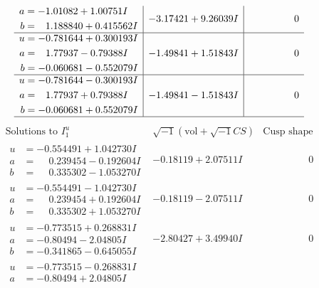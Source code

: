 \documentclass[1p]{elsarticle_modified}
\theoremstyle{definition}
\newcommand{\I}{\sqrt{-1}}
\begin{document}
$$\begin{array}{c|c|c}
\begin{aligned}
a &= -1.01082 + 1.00751 I \\
b &= \phantom{-}1.188840 + 0.415562 I\end{aligned}
 & -3.17421 + 9.26039 I & \phantom{-0.000000 } 0 \\ \hline\begin{aligned}
u &= -0.781644 + 0.300193 I \\
a &= \phantom{-}1.77937 - 0.79388 I \\
b &= -0.060681 - 0.552079 I\end{aligned}
 & -1.49841 + 1.51843 I & \phantom{-0.000000 } 0 \\ \hline\begin{aligned}
u &= -0.781644 - 0.300193 I \\
a &= \phantom{-}1.77937 + 0.79388 I \\
b &= -0.060681 + 0.552079 I\end{aligned}
 & -1.49841 - 1.51843 I & \phantom{-0.000000 } 0\\
 \hline 
 \end{array}$$\newpage$$\begin{array}{c|c|c}  
\text{Solutions to }I^u_{1}& \I (\text{vol} + \sqrt{-1}CS) & \text{Cusp shape}\\
 \hline 
\begin{aligned}
u &= -0.554491 + 1.042730 I \\
a &= \phantom{-}0.239454 - 0.192604 I \\
b &= \phantom{-}0.335302 - 1.053270 I\end{aligned}
 & -0.18119 + 2.07511 I & \phantom{-0.000000 } 0 \\ \hline\begin{aligned}
u &= -0.554491 - 1.042730 I \\
a &= \phantom{-}0.239454 + 0.192604 I \\
b &= \phantom{-}0.335302 + 1.053270 I\end{aligned}
 & -0.18119 - 2.07511 I & \phantom{-0.000000 } 0 \\ \hline\begin{aligned}
u &= -0.773515 + 0.268831 I \\
a &= -0.80494 - 2.04805 I \\
b &= -0.341865 - 0.645055 I\end{aligned}
 & -2.80427 + 3.49940 I & \phantom{-0.000000 } 0 \\ \hline\begin{aligned}
u &= -0.773515 - 0.268831 I \\
a &= -0.80494 + 2.04805 I \\

\end{aligned}
\end{array}$$
\end{document}
